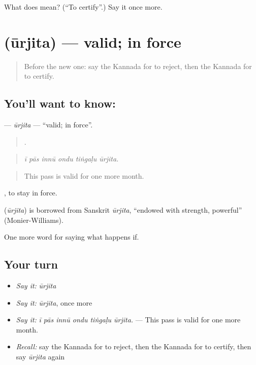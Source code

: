 \begin{tcolorbox}[breakable,colback=teal!4,colframe=teal!35!black,title={Before you move on}]
What does  mean? (\textquotedblleft{}To certify\textquotedblright{}.) Say it once more.
\end{tcolorbox}
\section[\texorpdfstring{\kn{ಊರ್ಜಿತ} (ūrjita)}{ಊರ್ಜಿತ (ūrjita)}]{ (ūrjita) — valid; in force}

\label{lesson:KA-C425-urjita}



\begin{quote}
Before the new one: say the Kannada for to reject, then the Kannada for to certify.
\end{quote}

\subsection*{You'll want to know: }
\textbf{} — \emph{ūrjita} — \textquotedblleft{}valid; in force\textquotedblright{}.

\begin{quote}
     .
\end{quote}

\begin{quote}
\emph{ī pās innū ondu tiṅgaḷu ūrjita.}
\end{quote}

\begin{quote}
This pass is valid for one more month.
\end{quote}

, to stay in force.

\begin{cousinweb}
\textbf{} (\emph{ūrjita}) is borrowed from Sanskrit \emph{ūrjita}, \textquotedblleft{}endowed with strength, powerful\textquotedblright{} (Monier-Williams).
\end{cousinweb}

\begin{grammarlens}[title={What you've built}]
One more word for saying what happens if.
\end{grammarlens}

\subsection*{Your turn}
\begin{itemize}
\raggedright
  \item \emph{Say it:} \emph{ūrjita}
  \item \emph{Say it:} \emph{ūrjita}, once more
  \item \emph{Say it:} \emph{ī pās innū ondu tiṅgaḷu ūrjita.} — This pass is valid for one more month.
  \item \emph{Recall:} say the Kannada for to reject, then the Kannada for to certify, then say \emph{ūrjita} again
\end{itemize}

